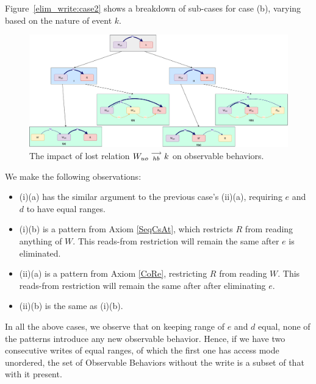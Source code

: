     Figure~\ref{elim_write:case2} shows a breakdown of sub-cases for case (b), varying based
    on the nature of event $k$.
    \begin{figure}[H]
        \centering
        \includegraphics[scale=0.3]{6.Elimination/1.ValidEliminationCandidate/WriteElimProof/ProofParts/Part4Case2.pdf}
        \caption{The impact of lost relation $W_{uo}\stackrel{\longrightarrow}{_{hb}}k$ on observable behaviors.}
        \label{elim_write:case1}
    \end{figure}

    We make the following observations:
    \begin{itemize}
        \item (i)(a) has the similar argument to the previous case's (ii)(a), requiring $e$ and $d$ to have equal ranges.
        \item (i)(b) is a pattern from Axiom \ref{SeqCsAt}, which restricts $R$ from reading anything of $W$. This reads-from restriction will remain the same after $e$ is eliminated. 
        \item (ii)(a) is a pattern from Axiom \ref{CoRe}, restricting $R$ from reading $W$. This reads-from restriction will remain the same after after eliminating $e$.
        \item (ii)(b) is the same as (i)(b).
    \end{itemize}

    In all the above cases, we observe that on keeping range of $e$ and $d$ equal, none of the patterns introduce any new observable behavior. Hence, if we have two consecutive writes of equal ranges, of which the first one has access mode unordered, the set of Observable Behaviors without the write is a subset of that with it present. 